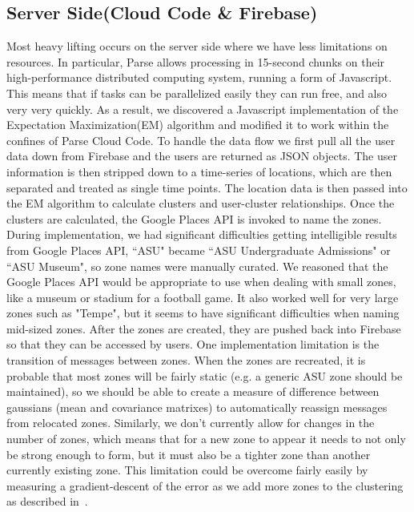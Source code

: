\subsection{Server Side(Cloud Code \& Firebase)}
Most heavy lifting occurs on the server side where we have less limitations on resources.  In particular, Parse allows processing in 15-second chunks on their high-performance distributed computing system, running a form of Javascript.  This means that if tasks can be parallelized easily they can run free, and also very very quickly.  As a result, we discovered a Javascript implementation of the Expectation Maximization(EM) algorithm and modified it to work within the confines of Parse Cloud Code.  To handle the data flow we first pull all the user data down from Firebase and the users are returned as JSON objects. The user information is then stripped down to a time-series of locations, which are then separated and treated as single time points. The location data is then passed into the EM algorithm to calculate clusters and user-cluster relationships.  Once the clusters are calculated, the Google Places API is invoked to name the zones.  During implementation, we had significant difficulties getting intelligible results from Google Places API, ``ASU" became ``ASU Undergraduate Admissions" or ``ASU Museum", so zone names were manually curated.  We reasoned that the Google Places API would be appropriate to use when dealing with small zones, like a museum or stadium for a football game. It also worked well for very large zones such as "Tempe", but it seems to have significant difficulties when naming mid-sized zones.  After the zones are created, they are pushed back into Firebase so that they can be accessed by users.  One implementation limitation is the transition of messages between zones.  When the zones are recreated, it is probable that most zones will be fairly static (e.g. a generic ASU zone should be maintained),  so we should be able to create a measure of difference between gaussians (mean and covariance matrixes) to automatically reassign messages from relocated zones.  Similarly, we don't currently allow for changes in the number of zones, which means that for a new zone to appear it needs to not only be strong enough to form, but it must also be a tighter zone than another currently existing zone.  This limitation could be overcome fairly easily by measuring a gradient-descent of the error as we add more zones to the clustering as described in~\cite{ray1999determination}.







 